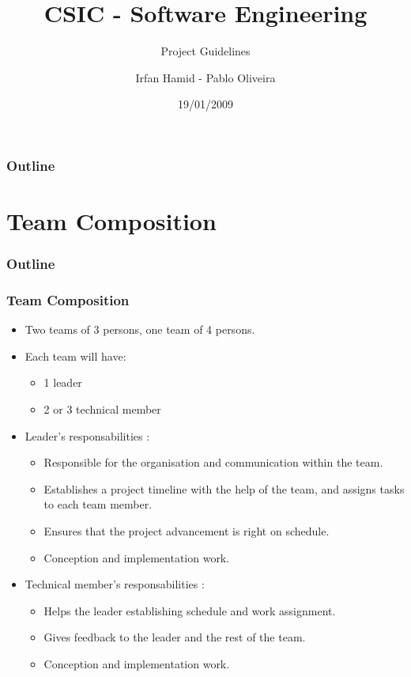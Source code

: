 \documentclass[10pt]{beamer}
\title{CSIC - Software Engineering}
\subtitle{Project Guidelines}
\author{Irfan Hamid - Pablo Oliveira}
\institute{ENST}
\date{19/01/2009}
\begin{document}
\begin{frame}
  \titlepage
\end{frame}
\begin{frame}
  \frametitle{Outline}
  \tableofcontents[currentsection]
\end{frame}


\section{Team Composition}
\begin{frame}
  \frametitle{Outline}
  \tableofcontents[currentsection]
\end{frame}


\begin{frame}
  \frametitle{Team Composition}
  \begin{itemize}
  \item Two teams of 3 persons, one team of 4 persons.
  \item Each team will have:
    \begin{itemize}
    \item 1 leader
    \item 2 or 3 technical member
    \end{itemize}
  \item Leader's responsabilities :
    \begin{itemize}
      \item Responsible for the organisation and communication within the team.
      \item Establishes a project timeline with the help of the team, and assigns
        tasks to each team member.
      \item Ensures that the project advancement is right on schedule.
      \item Conception and implementation work.
    \end{itemize}
  \item Technical member's responsabilities :
    \begin{itemize}
    \item Helps the leader establishing schedule and work assignment.
    \item Gives feedback to the leader and the rest of the team.
    \item Conception and implementation work.
    \end{itemize}
  \end{itemize}
\end{frame}
\end{document}
